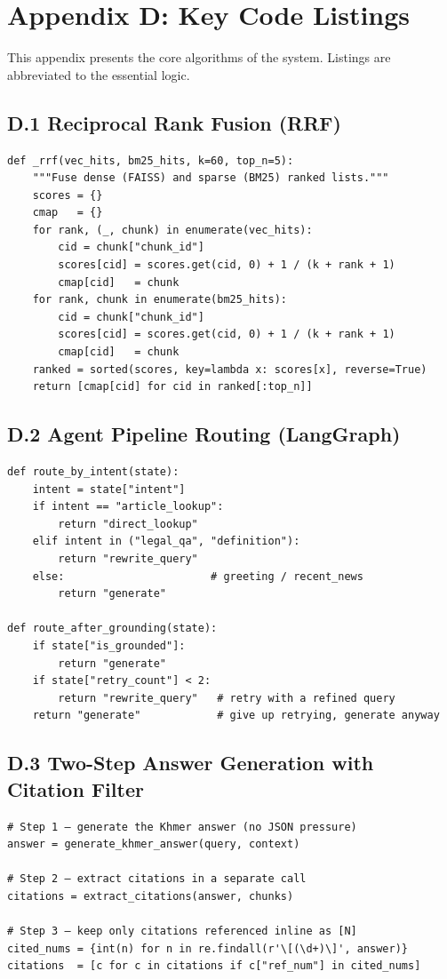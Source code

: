 \section*{Appendix D: Key Code Listings}

\hs This appendix presents the core algorithms of the system. Listings are abbreviated
to the essential logic.

\subsection*{D.1 Reciprocal Rank Fusion (RRF)}
\begin{verbatim}
def _rrf(vec_hits, bm25_hits, k=60, top_n=5):
    """Fuse dense (FAISS) and sparse (BM25) ranked lists."""
    scores = {}
    cmap   = {}
    for rank, (_, chunk) in enumerate(vec_hits):
        cid = chunk["chunk_id"]
        scores[cid] = scores.get(cid, 0) + 1 / (k + rank + 1)
        cmap[cid]   = chunk
    for rank, chunk in enumerate(bm25_hits):
        cid = chunk["chunk_id"]
        scores[cid] = scores.get(cid, 0) + 1 / (k + rank + 1)
        cmap[cid]   = chunk
    ranked = sorted(scores, key=lambda x: scores[x], reverse=True)
    return [cmap[cid] for cid in ranked[:top_n]]
\end{verbatim}

\subsection*{D.2 Agent Pipeline Routing (LangGraph)}
\begin{verbatim}
def route_by_intent(state):
    intent = state["intent"]
    if intent == "article_lookup":
        return "direct_lookup"
    elif intent in ("legal_qa", "definition"):
        return "rewrite_query"
    else:                       # greeting / recent_news
        return "generate"

def route_after_grounding(state):
    if state["is_grounded"]:
        return "generate"
    if state["retry_count"] < 2:
        return "rewrite_query"   # retry with a refined query
    return "generate"            # give up retrying, generate anyway
\end{verbatim}

\subsection*{D.3 Two-Step Answer Generation with Citation Filter}
\begin{verbatim}
# Step 1 — generate the Khmer answer (no JSON pressure)
answer = generate_khmer_answer(query, context)

# Step 2 — extract citations in a separate call
citations = extract_citations(answer, chunks)

# Step 3 — keep only citations referenced inline as [N]
cited_nums = {int(n) for n in re.findall(r'\[(\d+)\]', answer)}
citations  = [c for c in citations if c["ref_num"] in cited_nums]
\end{verbatim}

